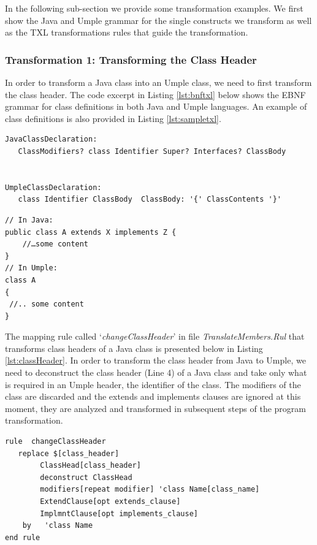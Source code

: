 In the following sub-section we provide some transformation examples. We first show the Java and Umple grammar for the single constructs we transform as well as the TXL transformations rules that guide the transformation.

\subsubsection{Transformation 1: Transforming the Class Header} 

In order to transform a Java class into an Umple class, we need to first transform the class header. The code excerpt in Listing \ref{lst:bnftxl} below shows the EBNF grammar for class definitions in both Java and Umple languages. An example of class definitions is also provided in Listing \ref{lst:sampletxl}.

\begin{lstlisting}[style=umplePlain, caption="Class definition grammar in BNF form", label=lst:bnftxl]
JavaClassDeclaration: 
   ClassModifiers? class Identifier Super? Interfaces? ClassBody


UmpleClassDeclaration: 
   class Identifier ClassBody  ClassBody: '{' ClassContents '}'

\end{lstlisting}

\begin{lstlisting}[style=umplePlain, caption=Class definitions in Java and Umple, label=lst:sampletxl]
// In Java:
public class A extends X implements Z {
    //…some content
}
// In Umple:
class A 
{	
 //.. some content
}
\end{lstlisting}

The mapping rule called `\textit{changeClassHeader}' in file \textit{TranslateMembers.Rul} that transforms class headers of a Java class is presented below in Listing \ref{lst:classHeader}. In order to transform the class header from Java to Umple, we need to deconstruct the class header  (Line 4)  of a Java class and take only what is required in an Umple header, the identifier of the class. The modifiers of the class are discarded and the extends and implements clauses are ignored at this moment, they are analyzed and transformed in subsequent steps of the program transformation. 

\begin{lstlisting}[style=umplePlain, caption=TXL Mapping rule for transforming the class headers, label=lst:classHeader]
rule  changeClassHeader 	
   replace $[class_header] 		
    	ClassHead[class_header] 		
    	deconstruct ClassHead 					
    	modifiers[repeat modifier] 'class Name[class_name] 
        ExtendClause[opt extends_clause] 
        ImplmntClause[opt implements_clause]          
    by 	 'class Name 
end rule

\end{lstlisting}

